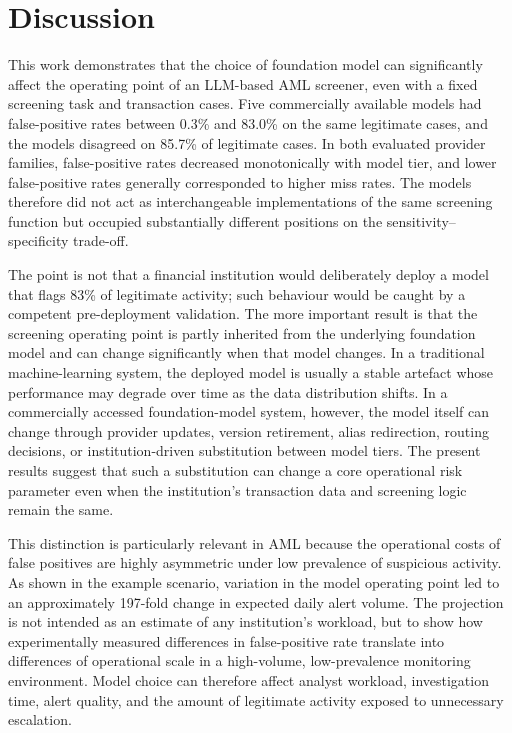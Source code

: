 \documentclass[pdflatex,sn-basic,Numbered]{sn-jnl}
\begin{document}
\section{Discussion}\label{sec:discussion}

This work demonstrates that the choice of foundation model can significantly affect the operating point of an LLM-based AML screener, even with a fixed screening task and transaction cases. Five commercially available models had false-positive rates between 0.3\% and 83.0\% on the same legitimate cases, and the models disagreed on 85.7\% of legitimate cases. In both evaluated provider families, false-positive rates decreased monotonically with model tier, and lower false-positive rates generally corresponded to higher miss rates. The models therefore did not act as interchangeable implementations of the same screening function but occupied substantially different positions on the sensitivity--specificity trade-off.

The point is not that a financial institution would deliberately deploy a model that flags 83\% of legitimate activity; such behaviour would be caught by a competent pre-deployment validation. The more important result is that the screening operating point is partly inherited from the underlying foundation model and can change significantly when that model changes. In a traditional machine-learning system, the deployed model is usually a stable artefact whose performance may degrade over time as the data distribution shifts. In a commercially accessed foundation-model system, however, the model itself can change through provider updates, version retirement, alias redirection, routing decisions, or institution-driven substitution between model tiers. The present results suggest that such a substitution can change a core operational risk parameter even when the institution's transaction data and screening logic remain the same.

This distinction is particularly relevant in AML because the operational costs of false positives are highly asymmetric under low prevalence of suspicious activity. As shown in the example scenario, variation in the model operating point led to an approximately 197-fold change in expected daily alert volume. The projection is not intended as an estimate of any institution's workload, but to show how experimentally measured differences in false-positive rate translate into differences of operational scale in a high-volume, low-prevalence monitoring environment. Model choice can therefore affect analyst workload, investigation time, alert quality, and the amount of legitimate activity exposed to unnecessary escalation.
\end{document}
